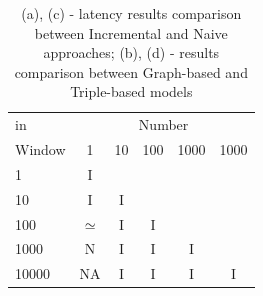 \begin{table}[htbp]
{\begin{tabular}{l | ccccc}
		in & \multicolumn{5}{c}{Number}  \\
		Window  & 1 & 10 & 100 & 1000 &1000\\
		\hline			
		1	&I	\\			
		10	&I	&I		\\	
		100	& $\simeq$	&I	&I		\\
		1000 &	N	&I	&I	&I	\\
		10000&	NA	&I	&I	&I	&I\\
		\hline %
		\end{tabular}
	}
	\caption{(a), (c) - latency results comparison between Incremental and Naive approaches; (b), (d) - results comparison between Graph-based and Triple-based models}
	\label{tab:soak_latency_comparisons}	
\end{table}

				


